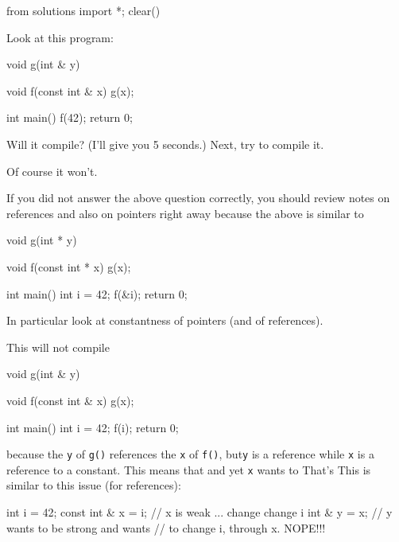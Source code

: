 \begin{python0}
from solutions import *; clear()
\end{python0}

Look at this program:

\begin{console}
void g(int & y)
{}

void f(const int & x)
{   
    g(x);
}

int main()
{   
    f(42);
    return 0;
}
\end{console}

Will it compile? (I'll give you 5 seconds.) Next, try to compile it.

Of course it won't.

If you did not answer the above question correctly, you should review
notes on references and also on pointers right away because the above is
similar to
\begin{console}
void g(int * y)
{}

void f(const int * x)
{    
     g(x);
}

int main()
{   
    int i = 42;
    f(&i);
    return 0;
}
\end{console}


In particular look at constantness of pointers (and of references).

This will not compile

\begin{console}
void g(int & y)
{}

void f(const int & x)
{    
     g(x);
}

int main()
{   
    int i = 42;
    f(i);
    return 0;
}
\end{console}


because the \texttt{y} of \texttt{g()} references the \texttt{x} of
\texttt{f()}, but\texttt{y} is a reference while \texttt{x} is a reference to
a constant. This means that  and yet \texttt{x} wants to  That's  This is similar to this issue (for references):

\begin{console}
int i = 42;
const int & x = i;   // x is weak ... change change i
int & y = x;         // y wants to be strong and wants
                     // to change i, through x. NOPE!!!
\end{console}

